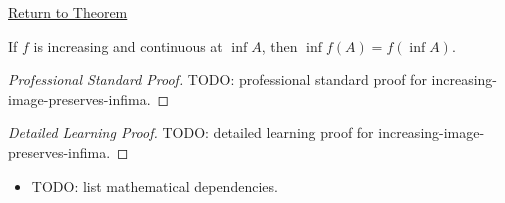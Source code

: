 \newpage
{}
\label{prf:increasing-image-preserves-infima}

\begin{remark*}[Return]
\hyperref[thm:increasing-image-preserves-infima]{Return to Theorem}
\end{remark*}

\begin{theorem*}
If $f$ is increasing and continuous at $\inf A$, then
$\inf f(A)=f(\inf A)$.
\end{theorem*}

\begin{proof}[Professional Standard Proof]
\LRAProofBodyStart
TODO: professional standard proof for increasing-image-preserves-infima.
\end{proof}

\begin{proof}[Detailed Learning Proof]
\LRAProofBodyStart
TODO: detailed learning proof for increasing-image-preserves-infima.
\end{proof}

\begin{remark*}
\end{remark*}

\begin{dependencies}
\begin{itemize}
  \item TODO: list mathematical dependencies.
\end{itemize}
\end{dependencies}

\clearpage
